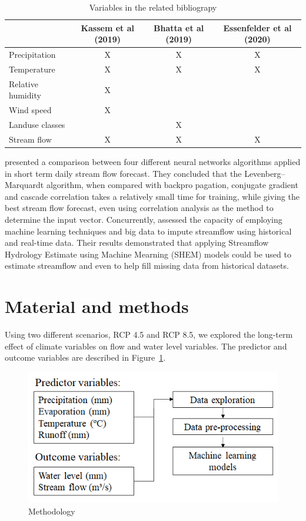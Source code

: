 \documentclass[12pt]{article}
\begin{document}
\begin{table}[htbp]
\centering
\caption{Variables in the related bibliograpy}
\label{tab:variables-literature}
    \begin{tabulary}{\textwidth}{lCCC}
        \toprule
           & Kassem et al (2019) & Bhatta et al (2019) & Essenfelder et al (2020) \\
        \midrule
            Precipitation & X & X & X \\
            Temperature & X & X & X \\
            Relative humidity & X &  & \\
            Wind speed  & X &  & \\
            Landuse classes  &  & X & \\
            Stream flow  & X & X & X \\
        \bottomrule
    \end{tabulary}
\end{table}

\cite{kicsi2007streamflow} presented a comparison between four different neural networks algorithms applied in short term daily stream flow forecast. They concluded that the Levenberg–Marquardt algorithm, when compared with backpro pagation, conjugate gradient and cascade correlation takes a relatively small time for training, while giving the best stream flow forecast, even using correlation analysis as the method to determine the input vector. Concurrently, \cite{petty2018streamflow} assessed the capacity of employing machine learning techniques and big data to impute streamflow using historical and real-time data. Their results demonstrated that applying Streamflow Hydrology Estimate using Machine Mearning (SHEM) models could be used to estimate streamflow and even to help fill missing data from historical datasets.

\section{Material and methods}
Using two different scenarios, RCP 4.5 and RCP 8.5, we explored the long-term effect of climate variables on flow and water level variables. The predictor and outcome variables are described in Figure~\ref{fig:approach}.

\begin{figure}[htbp]
  \centering
  \includegraphics[width=0.5\linewidth]{Figures/approach.png}
  \caption{Methodology}
  \label{fig:approach}
\end{figure}
\end{document}
